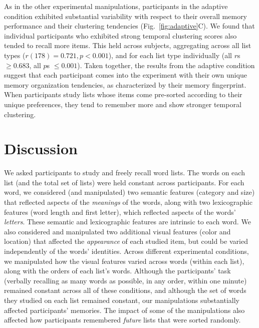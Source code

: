 \documentclass[11pt]{article}
\begin{document}
As in the other experimental manipulations, participants in the adaptive
condition exhibited substantial variability with respect to their overall
memory performance and their clustering tendencies (Fig.~\ref{fig:adaptive}C).
We found that individual participants who exhibited strong temporal clustering
scores also tended to recall more items. This held across subjects, aggregating
across all list types ($r(178) = 0.721, p < 0.001$), and for each list type
individually (all $r$s $\geq 0.683$, all $p$s $\leq 0.001$). Taken together,
the results from the adaptive condition suggest that each participant comes
into the experiment with their own unique memory organization tendencies, as
characterized by their memory fingerprint. When participants study lists whose
items come pre-sorted according to their unique preferences, they tend to remember
more and show stronger temporal clustering.

\section*{Discussion}


We asked participants to study and freely recall word lists. The words on each
list (and the total set of lists) were held constant across participants. For
each word, we considered (and manipulated) two semantic features (category and
size) that reflected aspects of the \textit{meanings} of the words, along with
two lexicographic features (word length and first letter), which reflected
aspects of the words' \textit{letters}. These semantic and lexicographic
features are intrinsic to each word. We also considered and manipulated two
additional visual features (color and location) that affected the
\textit{appearance} of each studied item, but could be varied independently of
the words' identities. Across different experimental conditions, we manipulated
how the visual features varied across words (within each list), along with the
orders of each list's words. Although the participants' task (verbally
recalling as many words as possible, in any order, within one minute) remained
constant across all of these conditions, and although the set of words they
studied on each list remained constant, our manipulations substantially
affected participants' memories. The impact of some of the manipulations also
affected how participants remembered \textit{future} lists that were sorted
randomly.

\end{document}
